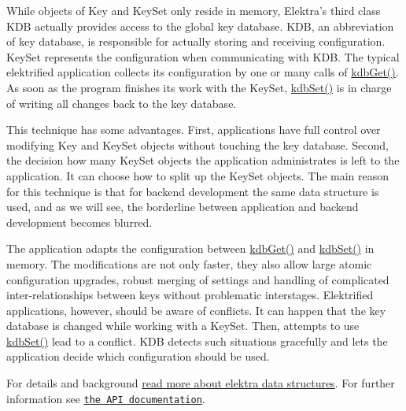 While objects of {\ttfamily Key} and {\ttfamily Key\+Set} only reside in memory, Elektra's third class {\ttfamily K\+D\+B} actually provides access to the global key database. {\ttfamily K\+D\+B}, an abbreviation of key database, is responsible for actually storing and receiving configuration. {\ttfamily Key\+Set} represents the configuration when communicating with {\ttfamily K\+D\+B}. The typical elektrified application collects its configuration by one or many calls of {\ttfamily \hyperlink{group__kdb_ga28e385fd9cb7ccfe0b2f1ed2f62453a1}{kdb\+Get()}}. As soon as the program finishes its work with the {\ttfamily Key\+Set}, {\ttfamily \hyperlink{group__kdb_ga11436b058408f83d303ca5e996832bcf}{kdb\+Set()}} is in charge of writing all changes back to the key database.

This technique has some advantages. First, applications have full control over modifying {\ttfamily Key} and {\ttfamily Key\+Set} objects without touching the key database. Second, the decision how many {\ttfamily Key\+Set} objects the application administrates is left to the application. It can choose how to split up the {\ttfamily Key\+Set} objects. The main reason for this technique is that for backend development the same data structure is used, and as we will see, the borderline between application and backend development becomes blurred.

The application adapts the configuration between {\ttfamily \hyperlink{group__kdb_ga28e385fd9cb7ccfe0b2f1ed2f62453a1}{kdb\+Get()}} and {\ttfamily \hyperlink{group__kdb_ga11436b058408f83d303ca5e996832bcf}{kdb\+Set()}} in memory. The modifications are not only faster, they also allow large atomic configuration upgrades, robust merging of settings and handling of complicated inter-\/relationships between keys without problematic interstages. Elektrified applications, however, should be aware of conflicts. It can happen that the key database is changed while working with a {\ttfamily Key\+Set}. Then, attempts to use {\ttfamily \hyperlink{group__kdb_ga11436b058408f83d303ca5e996832bcf}{kdb\+Set()}} lead to a conflict. {\ttfamily K\+D\+B} detects such situations gracefully and lets the application decide which configuration should be used.

For details and background \hyperlink{md_doc_help_elektra-data-structures_doc_help_elektra-data-structures_md}{read more about elektra data structures}. For further information see \href{http://doc.libelektra.org/api/current/html/}{\tt the A\+P\+I documentation}. 